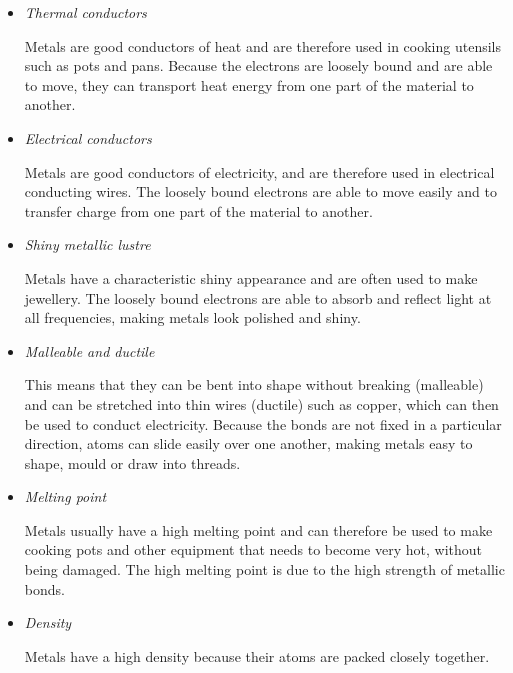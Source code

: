 \begin{itemize}
\item{\textit{Thermal conductors}

Metals are good conductors of heat and are therefore used in cooking utensils such as pots and pans. Because the electrons are loosely bound and are able to move, they can transport heat energy from one part of the material to another.}

\item{\textit{Electrical conductors}

Metals are good conductors of electricity, and are therefore used in electrical conducting wires. The loosely bound electrons are able to move easily and to transfer charge from one part of the material to another.}

\item{\textit{Shiny metallic lustre}

Metals have a characteristic shiny appearance and are often used to make jewellery. The loosely bound electrons are able to absorb and reflect light at all frequencies, making metals look polished and shiny.}

\item{\textit{Malleable and ductile}

This means that they can be bent into shape without breaking (malleable) and can be stretched into thin wires (ductile) such as copper, which can then be used to conduct electricity. Because the bonds are not fixed in a particular direction, atoms can slide easily over one another, making metals easy to shape, mould or draw into threads.}

\item{\textit{Melting point}

Metals usually have a high melting point and can therefore be used to make cooking pots and other equipment that needs to become very hot, without being damaged. The high melting point is due to the high strength of metallic bonds.}

\item{\textit{Density}

Metals have a high density because their atoms are packed closely together.}

\end{itemize} 

